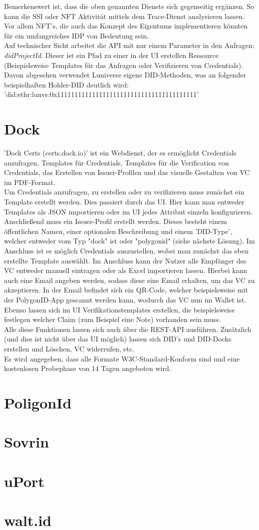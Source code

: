 Bemerkenswert ist, dass die oben genannten Dienste sich gegenseitig ergänzen. So kann die SSI oder NFT Aktivität mittels dem Trace-Dienst analysieren lassen. Vor allem NFT's, die auch das Konzept des Eigentums implementieren könnten für ein umfangreiches IDP von Bedeutung sein. \\
Auf technischer Sicht arbeitet die API mit nur einem Parameter in den Anfragen: \textsl{didProjectId}. Dieser ist ein Pfad zu einer in der UI erstellen Ressource (Beispielsweise Templates für das Anfragen oder Verifizieren von Credentials). Davon abgesehen verwendet Luniverse eigene DID-Methoden, was an folgender beispielhaften Holder-DID deutlich wird: 'did:ethr:lunvs:0x1111111111111111111111111111111111111111' 

\section{Dock}
'Dock Certs (certs.dock.io)' ist ein Webdienst, der es ermöglicht Credentials anzufragen, Templates für Credentials, Templates für die Verification von Credentials, das Erstellen von Issuer-Profilen und das visuelle Gestalten von VC im PDF-Format.\\
Um Credentials anzufragen, zu erstellen oder zu verifizieren muss zunächst ein Template erstellt werden. Dies passiert durch das UI. Hier kann man entweder Templates als JSON importieren oder im UI jedes Attribut einzeln konfigurieren. Anschließend muss ein Issuer-Profil erstellt werden. Dieses besteht einem öffentlichen Namen, einer optionalen Beschreibung und einem 'DID-Type', welcher entweder vom Typ "dock" ist oder "polygonid" (siehe nächste Lösung).
Im Anschluss ist es möglich Credentials auszustellen, wobei man zunächst das eben erstellte Template auswählt. Im Anschluss kann der Nutzer alle Empfänger des VC entweder manuell eintragen oder als Excel importieren lassen. Hierbei kann auch eine Email angeben werden, sodass diese eine Email erhalten, um das VC zu akzeptieren. In der Email befindet sich ein QR-Code, welcher beispielsweise mit der PolygonID-App gescannt werden kann, wodurch das VC nun im Wallet ist.
Ebenso lassen sich im UI Verifikationstemplates erstellen, die beispielsweise festlegen welcher Claim (zum Beispiel eine Note) vorhanden sein muss.\\
Alle diese Funktionen lassen sich auch über die REST-API ausführen. Zusätzlich (und dies ist nicht über das UI möglich) lassen sich DID's und DID-Docks erstellen und Löschen, VC widerrufen, etc. \\
Es wird angegeben, dass alle Formate W3C-Standard-Konform sind und eine kostenlosen Probephase von 14 Tagen angeboten wird.


\section{PoligonId}
\blindtext


\section{Sovrin}
\blindtext

\section{uPort}
\blindtext

\section{walt.id}
\blindtext